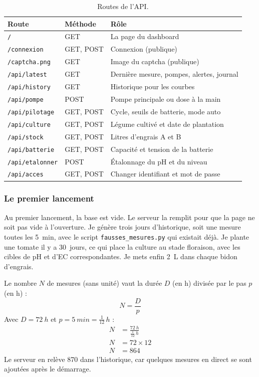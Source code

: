 \begin{table}[H]
\centering
\small
\begin{tabularx}{\textwidth}{|l|l|Y|}
\hline
\textbf{Route} & \textbf{Méthode} & \textbf{Rôle} \\
\hline
\texttt{/} & GET & La page du dashboard \\
\hline
\texttt{/connexion} & GET, POST & Connexion (publique) \\
\hline
\texttt{/captcha.png} & GET & Image du captcha (publique) \\
\hline
\texttt{/api/latest} & GET & Dernière mesure, pompes, alertes, journal \\
\hline
\texttt{/api/history} & GET & Historique pour les courbes \\
\hline
\texttt{/api/pompe} & POST & Pompe principale ou dose à la main \\
\hline
\texttt{/api/pilotage} & GET, POST & Cycle, seuils de batterie, mode auto \\
\hline
\texttt{/api/culture} & GET, POST & Légume cultivé et date de plantation \\
\hline
\texttt{/api/stock} & GET, POST & Litres d'engrais A et B \\
\hline
\texttt{/api/batterie} & GET, POST & Capacité et tension de la batterie \\
\hline
\texttt{/api/etalonner} & POST & Étalonnage du pH et du niveau \\
\hline
\texttt{/api/acces} & GET, POST & Changer identifiant et mot de passe \\
\hline
\end{tabularx}
\caption{Routes de l'API.}
\end{table}

\subsubsection*{Le premier lancement}

Au premier lancement, la base est vide. Le serveur la remplit pour que la page ne soit pas vide à l'ouverture. Je génère trois jours d'historique, soit une mesure toutes les \qty{5}{min}, avec le script \texttt{fausses\_mesures.py} qui existait déjà. Je plante une tomate il y a \qty{30}{jours}, ce qui place la culture au stade floraison, avec les cibles de pH et d'EC correspondantes. Je mets enfin \qty{2}{L} dans chaque bidon d'engrais.

\begin{demonstration}
Le nombre $N$ de mesures (sans unité) vaut la durée $D$ (en h) divisée par le pas $p$ (en h) :
\[
N = \frac{D}{p}
\]
Avec $D = \qty{72}{h}$ et $p = \qty{5}{min} = \tfrac{1}{12}\,\unit{h}$ :
\begin{align*}
N &= \frac{\qty{72}{h}}{\frac{1}{12}\,\unit{h}}\\
N &= 72\times 12\\
N &= 864
\end{align*}
Le serveur en relève \num{870} dans l'historique, car quelques mesures en direct se sont ajoutées après le démarrage.
\end{demonstration}

